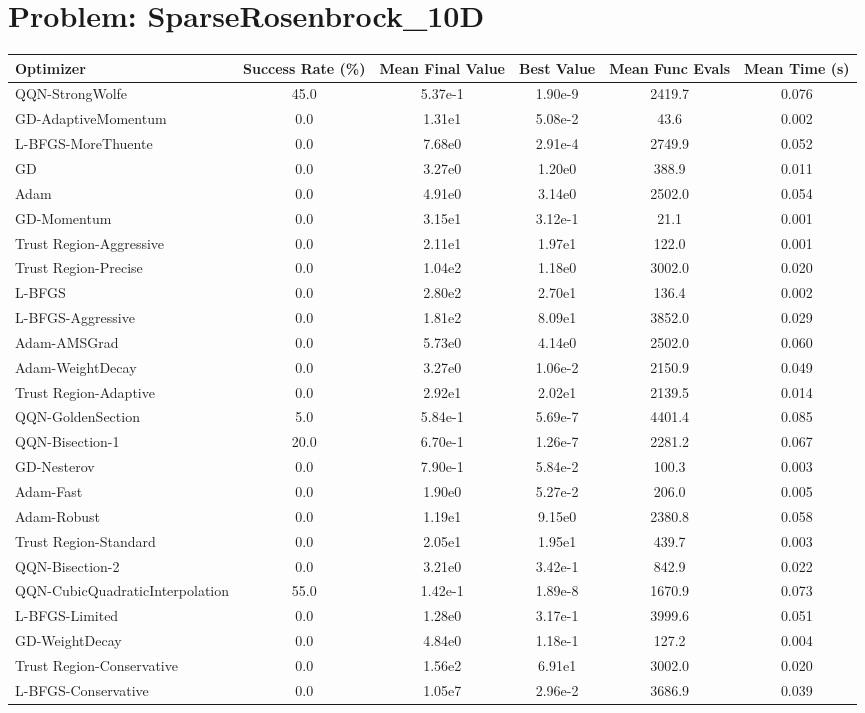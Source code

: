 \documentclass{article}
\begin{document}
\section{Problem: SparseRosenbrock\_10D}
\begin{longtable}{p{3cm}*{5}{c}}
\toprule
\textbf{Optimizer} & \textbf{Success Rate (\%)} & \textbf{Mean Final Value} & \textbf{Best Value} & \textbf{Mean Func Evals} & \textbf{Mean Time (s)} \\
\midrule
QQN-StrongWolfe & 45.0 & 5.37e-1 & 1.90e-9 & 2419.7 & 0.076 \\
GD-AdaptiveMomentum & 0.0 & 1.31e1 & 5.08e-2 & 43.6 & 0.002 \\
L-BFGS-MoreThuente & 0.0 & 7.68e0 & 2.91e-4 & 2749.9 & 0.052 \\
GD & 0.0 & 3.27e0 & 1.20e0 & 388.9 & 0.011 \\
Adam & 0.0 & 4.91e0 & 3.14e0 & 2502.0 & 0.054 \\
GD-Momentum & 0.0 & 3.15e1 & 3.12e-1 & 21.1 & 0.001 \\
Trust Region-Aggressive & 0.0 & 2.11e1 & 1.97e1 & 122.0 & 0.001 \\
Trust Region-Precise & 0.0 & 1.04e2 & 1.18e0 & 3002.0 & 0.020 \\
L-BFGS & 0.0 & 2.80e2 & 2.70e1 & 136.4 & 0.002 \\
L-BFGS-Aggressive & 0.0 & 1.81e2 & 8.09e1 & 3852.0 & 0.029 \\
Adam-AMSGrad & 0.0 & 5.73e0 & 4.14e0 & 2502.0 & 0.060 \\
Adam-WeightDecay & 0.0 & 3.27e0 & 1.06e-2 & 2150.9 & 0.049 \\
Trust Region-Adaptive & 0.0 & 2.92e1 & 2.02e1 & 2139.5 & 0.014 \\
QQN-GoldenSection & 5.0 & 5.84e-1 & 5.69e-7 & 4401.4 & 0.085 \\
QQN-Bisection-1 & 20.0 & 6.70e-1 & 1.26e-7 & 2281.2 & 0.067 \\
GD-Nesterov & 0.0 & 7.90e-1 & 5.84e-2 & 100.3 & 0.003 \\
Adam-Fast & 0.0 & 1.90e0 & 5.27e-2 & 206.0 & 0.005 \\
Adam-Robust & 0.0 & 1.19e1 & 9.15e0 & 2380.8 & 0.058 \\
Trust Region-Standard & 0.0 & 2.05e1 & 1.95e1 & 439.7 & 0.003 \\
QQN-Bisection-2 & 0.0 & 3.21e0 & 3.42e-1 & 842.9 & 0.022 \\
QQN-CubicQuadraticInterpolation & 55.0 & 1.42e-1 & 1.89e-8 & 1670.9 & 0.073 \\
L-BFGS-Limited & 0.0 & 1.28e0 & 3.17e-1 & 3999.6 & 0.051 \\
GD-WeightDecay & 0.0 & 4.84e0 & 1.18e-1 & 127.2 & 0.004 \\
Trust Region-Conservative & 0.0 & 1.56e2 & 6.91e1 & 3002.0 & 0.020 \\
L-BFGS-Conservative & 0.0 & 1.05e7 & 2.96e-2 & 3686.9 & 0.039 \\
\bottomrule
\end{longtable}
\end{document}
